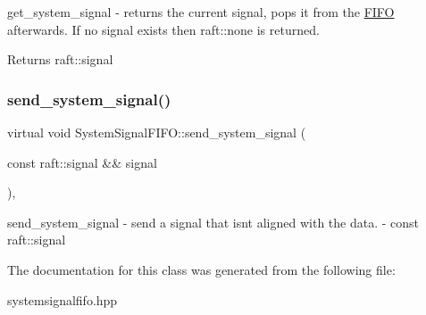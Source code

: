get\+\_\+system\+\_\+signal -\/ returns the current signal, pops it from the \hyperlink{class_f_i_f_o}{F\+I\+FO} afterwards. If no signal exists then raft\+::none is returned.

\begin{DoxyReturn}{Returns}
raft\+::signal 
\end{DoxyReturn}
\hypertarget{class_system_signal_f_i_f_o_ad427887bcb14067abd1ca7ed8c316d4d}{}\label{class_system_signal_f_i_f_o_ad427887bcb14067abd1ca7ed8c316d4d} 
\subsubsection{\texorpdfstring{send\+\_\+system\+\_\+signal()}{send\_system\_signal()}}
{\footnotesize\ttfamily virtual void System\+Signal\+F\+I\+F\+O\+::send\+\_\+system\+\_\+signal (\begin{DoxyParamCaption}\item[{const raft\+::signal \&\&}]{signal }\end{DoxyParamCaption})\hspace{0.3cm}{\ttfamily [protected]}, {}}

send\+\_\+system\+\_\+signal -\/ send a signal that isn\textquotesingle{}t aligned with the data.  -\/ const raft\+::signal 

The documentation for this class was generated from the following file\+:\begin{DoxyCompactItemize}
\item 
systemsignalfifo.\+hpp\end{DoxyCompactItemize}
